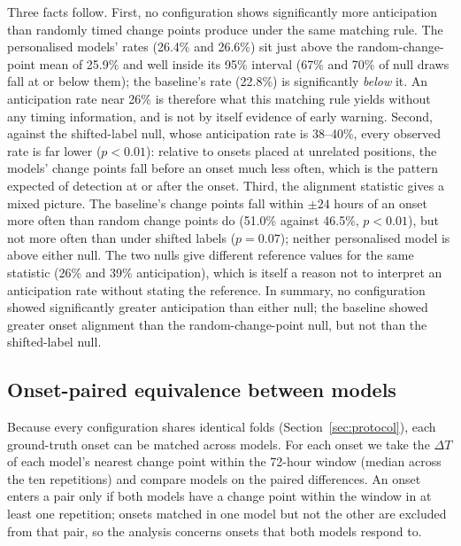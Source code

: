 \documentclass[preprint,12pt,authoryear]{elsarticle}
\newcommand{\dt}{$\Delta T$}
\begin{document}
Three facts follow. First, no configuration shows significantly more
anticipation than randomly timed change points produce under the same
matching rule. The personalised models' rates (26.4\% and 26.6\%) sit
just above the random-change-point mean of 25.9\% and well inside its
95\% interval (67\% and 70\% of null draws fall at or below them); the baseline's rate (22.8\%) is
significantly \emph{below} it. An anticipation rate near 26\% is
therefore what this matching rule yields without any timing information,
and is not by itself evidence of early warning. Second, against the
shifted-label null, whose anticipation rate is 38--40\%, every observed
rate is far lower ($p < 0.01$): relative to onsets placed at unrelated
positions, the models' change points fall before an onset much less
often, which is the pattern expected of detection at or after the
onset. Third, the alignment statistic gives a mixed picture. The
baseline's change points fall within $\pm 24$ hours of an onset more
often than random change points do (51.0\% against 46.5\%,
$p < 0.01$), but not more often than under shifted labels ($p = 0.07$);
neither personalised model is above either null. The two nulls give
different reference values for the same statistic (26\% and 39\%
anticipation), which is itself a reason not to interpret an
anticipation rate without stating the reference. In summary, no
configuration showed significantly greater anticipation than either
null; the baseline showed greater onset alignment than the
random-change-point null, but not than the shifted-label null.

\subsection{Onset-paired equivalence between models}
\label{sec:paired}

Because every configuration shares identical folds
(Section~\ref{sec:protocol}), each ground-truth onset can be matched across models.
For each onset we take the \dt{} of each model's nearest change point
within the 72-hour window (median across the ten repetitions) and
compare models on the paired differences. An onset enters a pair only
if both models have a change point within the window in at least one
repetition; onsets matched in one model but not the other are excluded
from that pair, so the analysis concerns onsets that both models
respond to.
\end{document}
